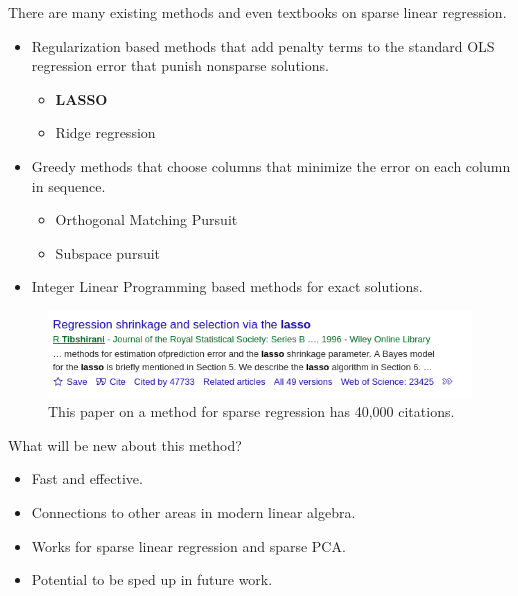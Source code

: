 \documentclass{beamer}
\begin{document}
\begin{frame}
    There are many existing methods and even textbooks on sparse linear regression.
    \begin{itemize}
        \item Regularization based methods that add penalty terms to the standard OLS regression error that punish nonsparse solutions.
            \begin{itemize}
                \item \textbf{LASSO}
                \item Ridge regression
            \end{itemize}
        \item Greedy methods that choose columns that minimize the error on each column in sequence.
            \begin{itemize}
                \item Orthogonal Matching Pursuit
                \item Subspace pursuit
            \end{itemize}
        \item Integer Linear Programming based methods for exact solutions.
    \end{itemize}
\end{frame}
\begin{frame}
    \begin{figure}[h]
        \centering
        \includegraphics[width=0.8\linewidth]{lasso_citations}
        \caption{This paper on a method for sparse regression has 40,000 citations.}%
    \end{figure}
\end{frame}
\begin{frame}
    What will be new about this method?
    \begin{itemize}
        \item Fast and effective.
        \item Connections to other areas in modern linear algebra.
        \item Works for sparse linear regression and sparse PCA.
        \item Potential to be sped up in future work.
    \end{itemize}
\end{frame}
\end{document}
